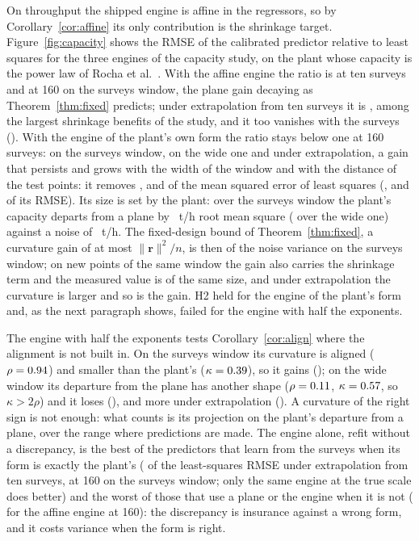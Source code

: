 On throughput the shipped engine is affine in the regressors, so by Corollary~\ref{cor:affine} its only contribution is the
shrinkage target. Figure~\ref{fig:capacity} shows the RMSE of the calibrated predictor relative to least squares for the three
engines of the capacity study, on the plant whose capacity is the power law of Rocha et al.~\cite{rocha}. With the affine engine
the ratio is \capAffSTen{} at ten surveys and \capAffSBig{} at 160 on the surveys window, the plane gain decaying as
Theorem~\ref{thm:fixed} predicts; under extrapolation from ten surveys it is \capAffXTen, among the largest shrinkage benefits of
the study, and it too vanishes with the surveys (\capAffXBig). With the engine of the plant's own form the ratio stays below one
at 160 surveys: \capRoSBig{} on the surveys window, \capRoWBig{} on the wide one and \capRoXBig{} under extrapolation, a gain that
persists and grows with the width of the window and with the distance of the test points: it removes \capRoMseS, \capRoMseW{}
and \capRoMseX\pct{} of the mean squared error of least squares (\capRoRmseS, \capRoRmseW{} and \capRoRmseX\pct{} of its RMSE).
Its size is set by the plant: over the surveys window the plant's capacity departs from a plane by \rRmsTph~t/h root mean square
(\rRmsTphW{} over the wide one) against a noise of \sigTph~t/h. The fixed-design bound of Theorem~\ref{thm:fixed}, a curvature
gain of at most $\|\mathbf r\|^2/n$, is then \curvCeilTph\pct{} of the noise variance on the surveys window; on new points of the
same window the gain also carries the shrinkage term and the measured value is of the same size, and under extrapolation the
curvature is larger and so is the gain. H2 held for the engine of the plant's form and, as the next paragraph shows, failed for the engine with half the exponents.

The engine with half the exponents tests Corollary~\ref{cor:align} where the alignment is not built in. On the surveys window
its curvature is aligned ($\rho=0.94$) and smaller than the plant's ($\kappa=0.39$), so it gains
(\capHalfSBig); on the wide window its departure from the plane has another shape ($\rho=0.11$, $\kappa=0.57$, so
$\kappa>2\rho$) and it loses (\capHalfWBig), and more under extrapolation (\capHalfXBig). A curvature of the right sign is not
enough: what counts is its projection on the plant's departure from a plane, over the range where predictions are made. The
engine alone, refit without a discrepancy, is the best of the predictors that learn from the surveys when its form is exactly
the plant's (\capRoRefitXTen{} of the least-squares RMSE under extrapolation from ten surveys, \capRoRefitSBig{} at 160 on the
surveys window; only the same engine at the true scale does better) and the worst of those that use a plane or the engine
when it is not (\capAffRefitSBig{} for the affine engine at 160): the discrepancy is insurance against a wrong form, and it
costs variance when the form is right.


